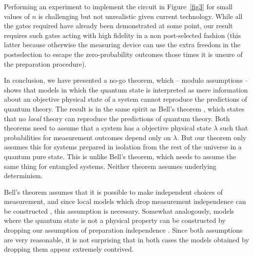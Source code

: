 \documentclass[amsmath,amssymb,superscriptaddress,pra,12pt]{revtex4-1}
\begin{document}
Performing an experiment to implement the circuit in Figure~\ref{fig3} for small values of $n$ is challenging but not unrealistic given current technology. While all the gates required have already been demonstrated at some point, our result requires such gates acting with high fidelity in a non post-selected fashion (this latter because otherwise the measuring device can use the extra freedom in the postselection to escape the zero-probability outcomes those times it is unsure of the preparation procedure).

In conclusion, we have presented a no-go theorem, which -- modulo assumptions -- shows that models in which the quantum state is interpreted as mere information about an objective physical state of a system cannot reproduce the predictions of quantum theory. The result is in the same spirit as Bell's theorem \cite{bell}, which states that no \emph{local} theory can reproduce the predictions of quantum theory. Both theorems need to assume that a system has a objective physical state $\lambda$ such that probabilities for measurement outcomes depend only on $\lambda$. But our theorem only assumes this for systems prepared in isolation from the rest of the universe in a quantum pure state. This is unlike Bell's theorem, which needs to assume the same thing for entangled systems. Neither theorem assumes underlying determinism.

Bell's theorem assumes that it is possible to make independent choices of measurement, and since local models which drop measurement independence can be constructed \cite{indep,indep2}, this assumption is necessary.  Somewhat analogously, models where the quantum state is not a physical property can be constructed by dropping our assumption of preparation independence \cite{ljbr}. Since both assumptions are very reasonable, it is not surprising that in both cases the models obtained by dropping them appear extremely contrived.
\end{document}
